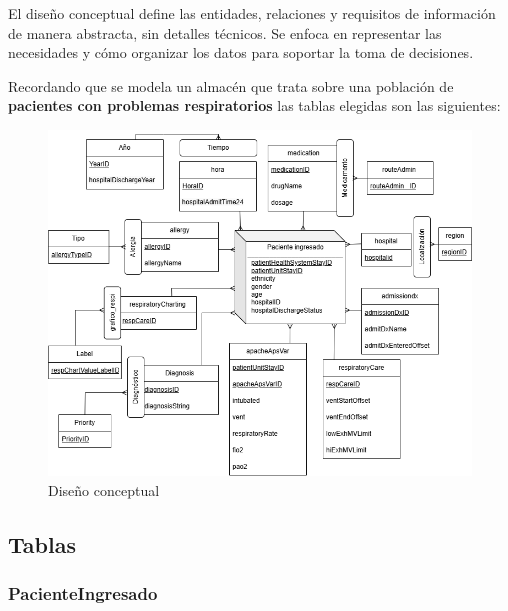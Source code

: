 \documentclass[12pt, a4paper, twoside]{article}
\begin{document}
	El diseño conceptual define las entidades, relaciones y requisitos de información de manera abstracta, sin detalles técnicos. Se enfoca en representar las necesidades y cómo organizar los datos para soportar la toma de decisiones.
	
	Recordando que se modela un almacén
	que trata sobre una población de \textbf{pacientes con problemas respiratorios} las tablas elegidas son las siguientes:
	
	
	
	\begin{figure}[h!]
		\begin{center}  %
			\includegraphics[width=1\textwidth]{image/diseno_conceptual.png}
			\caption{Diseño conceptual}
			\label{fig:conceptual}
		\end{center}
	\end{figure}
	
	
	
	\subsection{Tablas}
	
	\subsubsection{PacienteIngresado}
	
\end{document}
